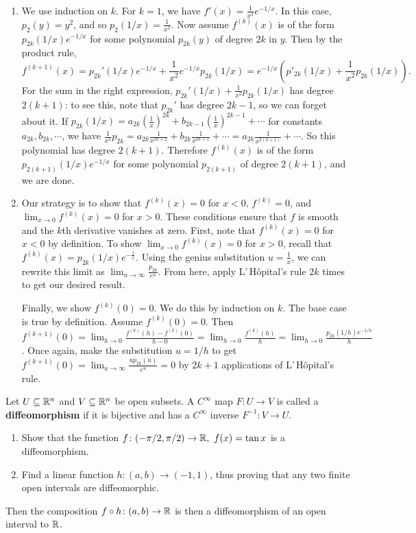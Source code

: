 \begin{solution}
    \,
    \begin{enumerate}[label=(\alph*)]
        \item We use induction on $k$. For $k=1$, we have $f'(x)=\frac{1}{x^2}e^{-1/x}$. In this case, $p_2(y)=y^2$, and so $p_2(1/x)=\frac{1}{x^2}$. Now assume $f^{(k)}(x)$ is of the form $p_{2k}(1/x)e^{-1/x}$ for some polynomial $p_{2k}(y)$ of degree $2k$ in $y.$ Then by the product rule,\[
                f^{(k+1)}(x)=p_{2k}'(1/x)e^{-1/x}+\frac{1}{x^2}e^{-1/x}p_{2k}(1/x)=e^{-1/x}\left( p'_{2k}(1/x) +\frac{1}{x^2}p_{2k}(1/x)\right) .
            \] For the sum in the right expression, $p_{2k}'(1/x)+\frac{1}{x^2}p_{2k}(1/x)$ has degree $2(k+1)$: to see this, note that $p_{2k}'$ has degree $2k-1$, so we can forget about it. If $p_{2k}(1/x)=a_{2k}\left(\frac{1}{x}\right)^{2k}+b_{2k-1}\left( \frac{1}{x} \right) ^{2k-1}+\cdots $ for constants $a_{2k},b_{2k},\cdots $, we have $\frac{1}{x^2}p_{2k}=a_{2k}\frac{1}{x^{2k+2}}+b_{2k}\frac{1}{x^{2k+1}}+\cdots =a_{2k}\frac{1}{x^{2(k+1)}}+\cdots $. So this polynomial has degree $2(k+1)$. Therefore $f^{(k)}(x)$ is of the form $p_{2(k+1)}(1/x)e^{-1/x}$ for some polynomial $p_{2(k+1)}$ of degree $2(k+1)$, and we are done.
        \item Our strategy is to show that $f^{(k)}(x)=0$ for $x<0$, $f^{(k)}=0$, and $\lim_{x\to 0}f^{(k)}(x)=0$ for $x>0$. These conditions ensure that $f$ is smooth and the $k$th derivative vanishes at zero. First, note that $f^{(k)}(x)=0$ for $x<0$ by definition. To show $\lim_{x\to 0}f^{(k)}(x)=0$ for $x>0$, recall that $f^{(k)}(x)=p_{2k}(1/x)e^{-\frac{1}{x}}$. Using the genius substitution $u=\frac{1}{x}$, we can rewrite this limit as $\lim_{u\to \infty}\frac{p_{2k}}{e^u}$. From here, apply L'\,H\^opital's rule $2k$ times to get our desired result.

            Finally, we show $f^{(k)}(0)=0$. We do this by induction on $k$. The base case is true by definition. Assume $f^{(k)}(0)=0$. Then $f^{(k+1)}(0)=\lim_{h\to 0}\frac{f^{(k)}(h)-f^{(k)}(0)}{h-0}=\lim_{h\to 0}\frac{f^{(k)}(h)}{h}=\lim_{h\to 0}\frac{p_{2k}(1/h)e^{-1/h}}{h}$. Once again, make the substitution $u=1/h$ to get $f^{(k+1)}(0)=\lim_{u\to \infty}\frac{u p_{2k}(u)}{e^u}=0$ by $2k+1$ applications of L'\,H\^opital's rule.\qedhere
    \end{enumerate}
\end{solution}
\begin{prob}
Let $U\subseteq \mathbb{R}^n $ and $V\subseteq \mathbb{R}^n $ be open subsets. A $C^{\infty}$ map $F \colon U \to V$ is called a \textbf{diffeomorphism} if it is bijective and has a $C^{\infty}$ inverse $F^{-1} \colon V \to U$.    
\begin{enumerate}[label=(\alph*)]
    \item Show that the function $f\colon (-\pi /2, \pi /2) \to \mathbb{R}, \ f(x)=\tan x$ is a diffeomorphism.
    \item Find a linear function $h \colon (a,b) \to (-1,1)$, thus proving that any two finite open intervals are diffeomorphic.
\end{enumerate}
Then the composition $f \circ h \colon (a,b) \to \mathbb{R}$ is then a diffeomorphism of an open interval to $\mathbb{R}$.
\end{prob}
